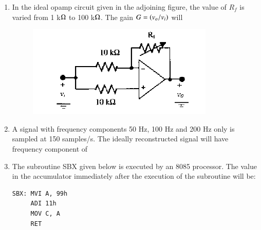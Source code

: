 \documentclass[journal,12pt,onecolumn]{IEEEtran}
\theoremstyle{remark}
\begin{document}
\begin{enumerate}
\item In the ideal opamp circuit given in the adjoining figure, the value of $R_f$ is varied from 1 k$\ohm$ to 100 k$\ohm$. The gain $G = \left(v_o/v_i\right)$ will
\begin{figure}[H]
    \centering
    \includegraphics[width = 0.7\columnwidth]{q18}
    \caption*{}
    \label{Q18}
\end{figure}

\hfill{}
\begin{enumerate} 
 \end{enumerate}


\item A signal with frequency components 50 Hz, 100 Hz and 200 Hz only is sampled at 150 samples/s. The ideally reconstructed signal will have frequency component of

\hfill{}\begin{enumerate}  \end{enumerate}

\item The subroutine SBX given below is executed by an 8085 processor. The value in the accumulator immediately after the execution of the subroutine will be:
\begin{verbatim}
SBX: MVI A, 99h
     ADI 11h
     MOV C, A
     RET
\end{verbatim}


\end{enumerate}
\end{document}
